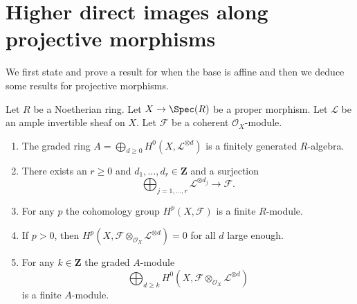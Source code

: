 \section{Higher direct images along projective morphisms}
\label{section-projective-pushforward}

\noindent
We first state and prove a result for when the base is affine
and then we deduce some results for projective morphisms.

\begin{lemma}
\label{lemma-coherent-proper-ample}
Let $R$ be a Noetherian ring. Let $X \to \Spec(R)$ be a proper morphism.
Let $\mathcal{L}$ be an ample invertible sheaf on $X$. Let $\mathcal{F}$
be a coherent $\mathcal{O}_X$-module.
\begin{enumerate}
\item The graded ring
$A = \bigoplus_{d \geq 0} H^0(X, \mathcal{L}^{\otimes d})$
is a finitely generated $R$-algebra.
\item There exists an $r \geq 0$ and
$d_1, \ldots, d_r \in \mathbf{Z}$ and a surjection
$$
\bigoplus\nolimits_{j = 1, \ldots, r} \mathcal{L}^{\otimes d_j}
\longrightarrow \mathcal{F}.
$$
\item For any $p$ the cohomology group $H^p(X, \mathcal{F})$ is a finite
$R$-module.
\item If $p > 0$, then
$H^p(X, \mathcal{F} \otimes_{\mathcal{O}_X} \mathcal{L}^{\otimes d}) = 0$
for all $d$ large enough.
\item For any $k \in \mathbf{Z}$ the graded $A$-module
$$
\bigoplus\nolimits_{d \geq k}
H^0(X, \mathcal{F} \otimes_{\mathcal{O}_X} \mathcal{L}^{\otimes d})
$$
is a finite $A$-module.
\end{enumerate}
\end{lemma}

